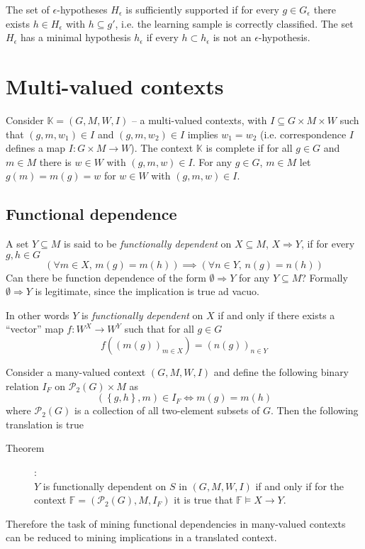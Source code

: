 \documentclass[a4paper]{article}
\newcommand{\obj}[1]{{\left\{ #1 \right \}}}
\newcommand{\brac}[1]{{\left ( #1 \right )}}
\newcommand{\Pwr}{\mathcal{P}}
\newcommand{\Ctx}{\mathbb{K}}
\begin{document}
The set of $\epsilon$-hypotheses $H_\epsilon$ is sufficiently supported if for every $g\in G_\epsilon$ there exists $h\in H_\epsilon$ with $h\subseteq g'$, i.e. the learning sample is correctly classified. The set $H_\epsilon$ has a minimal hypothesis $h_\epsilon$ if every $h\subset h_\epsilon$ is not an $\epsilon$-hypothesis.






\section{Multi-valued contexts} %
\label{sec:multi_valued_contexts}

Consider $\Ctx=\brac{G,M,W,I}$ -- a multi-valued contexts, with $I\subseteq G\times M\times W$ such that $(g,m,w_1)\in I$ and $(g,m,w_2)\in I$ implies $w_1=w_2$ (i.e. correspondence $I$ defines a map $I:G\times M\to W$). The context $\Ctx$ is complete if for all $g\in G$ and $m\in M$ there is $w\in W$ with $(g,m,w)\in I$. For any $g\in G$, $m\in M$ let $g(m)=m(g)=w$ for $w\in W$ with $(g,m,w)\in I$.

\subsection{Functional dependence} %
\label{sub:functional_dependence}

A set $Y\subseteq M$ is said to be \emph{functionally dependent} on $X\subseteq M$, $X\Rightarrow Y$, if for every $g,h\in G$ \[ \brac{ \forall m\in X,\,m(g)=m(h) } \implies \brac{ \forall n\in Y,\,n(g)=n(h) } \]
Can there be function dependence of the form $\emptyset \Rightarrow Y$ for any $Y\subseteq M$? Formally $\emptyset \Rightarrow Y$ is legitimate, since the implication is true ad vacuo.

In other words $Y$ is \emph{functionally dependent} on $X$ if and only if there exists a ``vector'' map $f: W^X\to W^Y$ such that for all $g\in G$ \[f\brac{\brac{m(g)}_{m\in X}} = \brac{n(g)}_{n\in Y}\] 

Consider a many-valued context $\brac{G,M,W,I}$ and define the following binary relation $I_F$ on $\Pwr_2{(G)}\times M$ as \[\brac{\obj{g,h},m}\in I_F \Leftrightarrow m(g)=m(h)\] where $\Pwr_2{(G)}$ is a collection of all two-element subsets of $G$. Then the following translation is true \begin{description}
	\item[Theorem]:\hfill \\
	$Y$ is functionally dependent on $S$ in $\brac{G,M,W,I}$ if and only if for the context $\mathbb{F} = \brac{\Pwr_2{(G)}, M, I_F}$ it is true that $\mathbb{F}\models X\to Y$.
\end{description}
Therefore the task of mining functional dependencies in many-valued contexts can be reduced to mining implications in a translated context.
\end{document}
